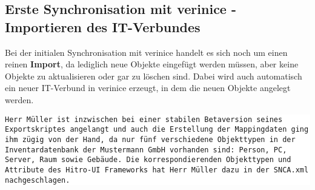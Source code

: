 \documentclass[a4paper,10pt]{book}
\begin{document}
\subsection{ Erste Synchronisation mit verinice - Importieren des IT-Verbundes}
Bei der initialen Synchronisation mit verinice handelt es sich noch um einen reinen \textbf{Import}, da lediglich neue
Objekte eingefügt werden müssen, aber keine Objekte zu aktualisieren oder gar zu löschen sind. Dabei wird auch automatisch
ein neuer IT-Verbund in verinice erzeugt, in dem die neuen Objekte angelegt werden.

\colorbox{white}{\parbox{\textwidth}{\tt Herr Müller ist inzwischen bei einer
stabilen Betaversion seines Exportskriptes angelangt und auch die Erstellung der
Mappingdaten ging ihm zügig von der Hand, da nur fünf verschiedene Objekttypen
in der Inventardatenbank der Mustermann GmbH vorhanden sind: Person, PC, Server,
Raum sowie Gebäude. Die korrespondierenden Objekttypen und Attribute des
Hitro-UI Frameworks hat Herr Müller dazu in der SNCA.xml nachgeschlagen.}}
\end{document}
